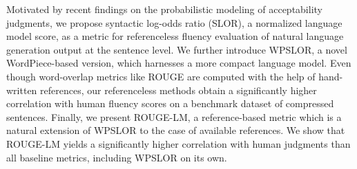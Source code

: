 Motivated by recent findings on the probabilistic modeling of acceptability judgments, we propose syntactic log-odds ratio (SLOR), a normalized language model score, as a metric for referenceless fluency evaluation of natural language generation output at the sentence level. We further introduce WPSLOR, a novel WordPiece-based version, which harnesses a more compact language model. Even though word-overlap metrics like ROUGE are computed with the help of hand-written references, our referenceless methods obtain a significantly higher correlation with human fluency scores on a benchmark dataset of compressed sentences. Finally, we present ROUGE-LM, a reference-based metric which is a natural extension of WPSLOR to the case of available references. We show that ROUGE-LM yields a significantly higher correlation with human judgments than all baseline metrics, including WPSLOR on its own.
